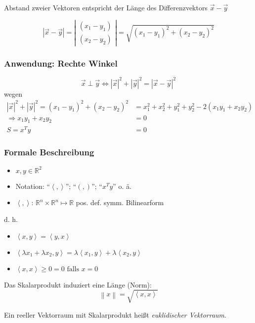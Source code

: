 \begin{note}
Abstand zweier Vektoren entspricht der Länge des Differenzvektors $\vec{x} - \vec{y}$
\end{note}

\begin{equation*}
	|\vec{x} - \vec{y}| = \left|
 	\begin{array}{cc}
		(x_1 - y_1)\\
		(x_2 - y_2)
 	\end{array}\right| = 
 	\sqrt{(x_1 - y_1)^2 + (x_2 - y_2)^2}
\end{equation*}

\subsubsection*{Anwendung: Rechte Winkel}

\begin{theorem}
\begin{equation*}
	\vec{x} \perp \vec{y} \Leftrightarrow |\vec{x}|^2 + |\vec{y}|^2 = |\vec{x} - \vec{y}|^2
\end{equation*}
wegen
\begin{align*}
	|\vec{x}|^2 + |\vec{y}|^2 = (x_1 - y_1)^2 + (x_2 - y_2)^2 &= x_1^2 + x_2^2 + y_1^2 + y_2^2 - 2(x_1 y_1 + x_2 y_2) \\
	\Rightarrow x_1 y_1 + x_2 y_2 &= 0 \\
	S = x^T y &= 0
\end{align*}
\end{theorem}

\subsubsection*{Formale Beschreibung}
\begin{definition}[Skalarprodukt]\flush
	\begin{itemize}
		\item $ x, y \in \mathbb{R}^2 $
		\item Notation: ``$ \left<, \right>$''; ``$(, )$''; ``$x^T y$'' o. ä.
		\item $\left<, \right>$: $\mathbb{R}^n \times \mathbb{R}^n \mapsto \mathbb{R}$ pos. def. symm. Bilinearform
	\end{itemize}
\end{definition}

\noindent d. h. \begin{itemize}
	\item $ \left<x, y\right> = \left<y, x\right>$
	\item $ \left<\lambda x_1 + \lambda x_2, y\right> = \lambda \left<x_1, y\right> + \lambda \left<x_2, y\right>$
	\item $ \left<x, x\right> \geq 0 = 0 \text{ falls } x = 0$
\end{itemize}
%
Das Skalarprodukt induziert eine Länge (Norm):
\begin{equation*}
	\left\| x \right\| = \sqrt{\left<x, x\right>}
\end{equation*}
%
\begin{definition}
  Ein reeller Vektorraum mit Skalarprodukt heißt \emph{euklidischer Vektorraum}.
\end{definition}

